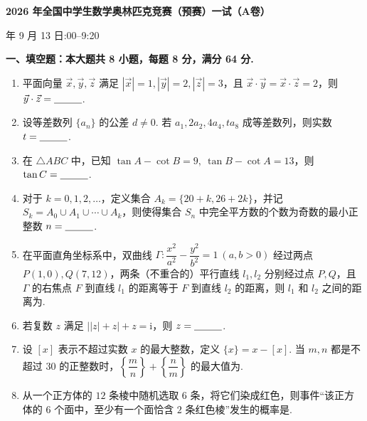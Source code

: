 \documentclass[UTF8,10pt]{ctexart}
\newcommand{\blank}{\underline{\hspace{2.8em}}}
\begin{document}
\fontsize{12.8pt}{21pt}\selectfont
\begin{center}
  {\fontsize{17.28pt}{21pt}\selectfont\bfseries 2026 年全国中学生数学奥林匹克竞赛（预赛）一试（A卷）\par}
  \vspace{2pt}
  { 年 9 月 13 日}:00--9:20
\end{center}
\vspace{2pt}

\noindent\textbf{一、填空题：本大题共 8 小题，每题 8 分，满分 64 分.}
\begin{enumerate}[label=\textbf{\arabic*.},itemsep=5pt]
  \item 平面向量 $\vec x,\vec y,\vec z$ 满足 $|\vec x|=1,|\vec y|=2,|\vec z|=3$，且
  $\vec x\cdot\vec y=\vec x\cdot\vec z=2$，则 $\vec y\cdot\vec z=\blank$.

  \item 设等差数列 $\{a_n\}$ 的公差 $d\ne0$. 若 $a_1,2a_2,4a_4,ta_8$ 成等差数列，则实数 $t=\blank$.

  \item 在 $\triangle ABC$ 中，已知 $\tan A-\cot B=9,\ \tan B-\cot A=13$，则 $\tan C=\blank$.

  \item 对于 $k=0,1,2,\ldots$，定义集合 $A_k=\{20+k,26+2k\}$，并记
  $S_k=A_0\cup A_1\cup\cdots\cup A_k$，则使得集合 $S_n$ 中完全平方数的个数为奇数的最小正整数 $n=\blank$.

  \item 在平面直角坐标系中，双曲线 $\Gamma:\dfrac{x^2}{a^2}-\dfrac{y^2}{b^2}=1\ (a,b>0)$ 经过两点
  $P(1,0),Q(7,12)$，两条（不重合的）平行直线 $l_1,l_2$ 分别经过点 $P,Q$，且 $\Gamma$ 的右焦点 $F$ 到直线
  $l_1$ 的距离等于 $F$ 到直线 $l_2$ 的距离，则 $l_1$ 和 $l_2$ 之间的距离为\blank.

  \item 若复数 $z$ 满足 $\bigl||z|+z\bigr|+z=\mathrm i$，则 $z=\blank$.

  \item 设 $[x]$ 表示不超过实数 $x$ 的最大整数，定义 $\{x\}=x-[x]$. 当 $m,n$ 都是不超过 $30$
  的正整数时，$\left\{\dfrac mn\right\}+\left\{\dfrac nm\right\}$ 的最大值为\blank.

  \item 从一个正方体的 $12$ 条棱中随机选取 $6$ 条，将它们染成红色，则事件“该正方体的 $6$
  个面中，至少有一个面恰含 $2$ 条红色棱”发生的概率是\blank.
\end{enumerate}
\end{document}
